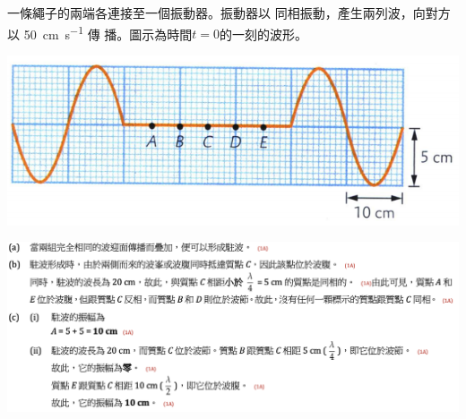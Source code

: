 {
    一條繩子的兩端各連接至一個振動器。振動器以 同相振動，產生兩列波，向對方以 \qty{50}{cm.s^{-1}} 傳 播。圖示為時間$t=0$的一刻的波形。
    \par{\par\centering\includegraphics[width=.5\textwidth]{./img/ch3_earlyclass_wave_lq_2024-05-14-13-45-39.png}\par}
}{
    \sol
    \par{\par\centering\includegraphics[width=\textwidth]{./img/ch3_earlyclass_wave_lq_2024-05-14-13-47-06.png}\par}
}